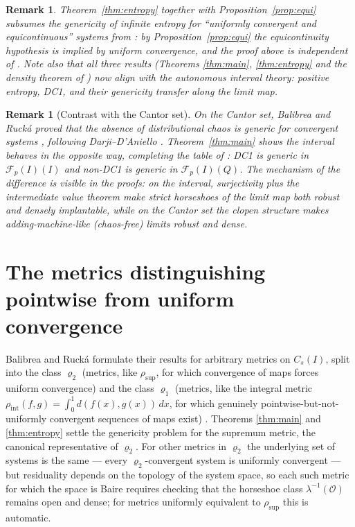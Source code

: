 \documentclass[11pt]{article}
\newtheorem{remark}[theorem]{Remark}
\newcommand{\I}{I}
\newcommand{\Cs}{C_s(\I)}
\newcommand{\Fp}{\mathcal F_p(\I)}
\newcommand{\rsup}{\rho_{\sup}}
\newcommand{\lm}{\lambda}
\begin{document}
\begin{remark}\label{rem:bss}
Theorem~\ref{thm:entropy} together with Proposition~\ref{prop:equi} subsumes the
genericity of infinite entropy for ``uniformly convergent and equicontinuous''
systems from \cite{BSS}: by Proposition~\ref{prop:equi} the equicontinuity
hypothesis is implied by uniform convergence, and the proof above is independent
of \cite{BSS}.  Note also that all three results
(Theorems \ref{thm:main}, \ref{thm:entropy} and the density theorem of \cite{BR})
now align with the autonomous interval theory: positive entropy, DC1, and their
genericity transfer along the limit map.
\end{remark}

\begin{remark}[Contrast with the Cantor set]
On the Cantor set, Balibrea and Ruck\'a proved that the \emph{absence} of
distributional chaos is generic for convergent systems \cite[Lemma 1]{BR},
following Darji--D'Aniello \cite{DD}.  Theorem~\ref{thm:main} shows the interval
behaves in the opposite way, completing the table of \cite[Section 4]{BR}: DC1 is
generic in $\Fp(\I)$ and non-DC1 is generic in $\Fp(Q)$.  The mechanism of the
difference is visible in the proofs: on the interval, surjectivity plus the
intermediate value theorem make strict horseshoes of the limit map both robust and
densely implantable, while on the Cantor set the clopen structure makes
adding-machine-like (chaos-free) limits robust and dense.
\end{remark}

\section{The metrics distinguishing pointwise from uniform convergence}
\label{sec:other}

Balibrea and Ruck\'a formulate their results for arbitrary metrics on $\Cs$,
split into the class $\varrho_2$ (metrics, like $\rsup$, for which convergence of
maps forces uniform convergence) and the class $\varrho_1$ (metrics, like the
integral metric $\rho_{\mathrm{int}}(f,g)=\int_0^1d(f(x),g(x))\,dx$, for which
genuinely pointwise-but-not-uniformly convergent sequences of maps exist)
\cite[Remark 1]{BR}.  Theorems \ref{thm:main} and \ref{thm:entropy} settle the
genericity problem for the supremum metric, the canonical representative of
$\varrho_2$.  For other metrics in $\varrho_2$ the underlying set of systems is
the same --- every $\varrho_2$-convergent system is uniformly convergent --- but
residuality depends on the topology of the system space, so each such metric for
which the space is Baire requires checking that the horseshoe class
$\lm^{-1}(\mathcal O)$ remains open and dense; for metrics uniformly equivalent
to $\rsup$ this is automatic.
\end{document}
